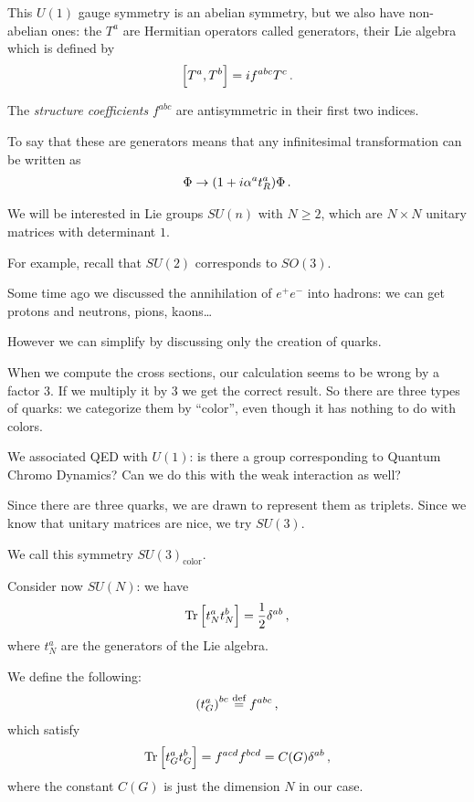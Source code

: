 \documentclass[main.tex]{subfiles}
\begin{document}
This \(U(1)\) gauge symmetry is an abelian symmetry, but we also have non-abelian ones: the \(T^{a}\) are Hermitian operators called generators, their Lie algebra which is defined by 
%
\begin{align}
\qty[T^{a}, T^{b}] = if^{abc} T^{c}
\,.
\end{align}

The \emph{structure coefficients} \(f^{abc}\) are antisymmetric in their first two indices. 

To say that these are generators means that any infinitesimal transformation can be written as 
%
\begin{align}
\Phi \to \qty(1 + i \alpha^{a} t^{a}_{R}) \Phi 
\,.
\end{align}

We will be interested in Lie groups \(SU(n)\) with \(N\geq 2\), which are \(N \times N\) unitary matrices with determinant \(1\).

For example, recall that \(SU(2)\) corresponds to \(SO(3)\). 

Some time ago we discussed the annihilation  of \(e^{+} e^{-}\) into hadrons: we can get protons and neutrons, pions, kaons\dots

However we can simplify by discussing only the creation of quarks. 

When we compute the cross sections, our calculation seems to be wrong by a factor 3. If we multiply it by 3 we get the correct result. 
So there are three types of quarks: we categorize them by ``color'', even though it has nothing to do with colors. 

We associated QED  with \(U(1)\): is there a group corresponding to Quantum Chromo Dynamics?
Can we do this with the weak interaction as well? 

Since there are three quarks, we are drawn to represent them as triplets. 
Since we know that unitary matrices are nice, we try \(SU(3)\). 

We call this symmetry \(SU(3)_{\text{color}}\). 

Consider now \(SU(N)\): we have 
%
\begin{align}
\Tr \qty[t^{a}_{N} t^{b}_{N}] = \frac{1}{2} \delta^{ab}
\,,
\end{align}
%
where \(t^{a}_{N}\) are the generators of the Lie algebra. 

We define the following: 
%
\begin{align}
\qty(t^{a}_{G})^{bc} \overset{\text{def}}{=} f^{abc}
\,,
\end{align}
%
which satisfy 
%
\begin{align}
\Tr \qty[t^{a}_{G} t^{b}_{G}] = f^{acd} f^{bcd} = C(G) \delta^{ab}
\,,
\end{align}
%
where the constant \(C(G)\) is just the dimension \(N\) in our case. 
\end{document}
